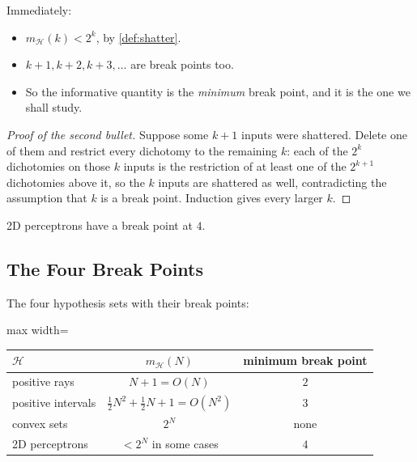Immediately:

\begin{itemize}
    \item \(m_{\mathcal{H}}(k) < 2^k\), by \autoref{def:shatter}.
    \item \(k + 1, k + 2, k + 3, \dots\) are break points too.
    \item So the informative quantity is the \emph{minimum} break point, and it
        is the one we shall study.
\end{itemize}

\begin{proof}[Proof of the second bullet]
    Suppose some \(k + 1\) inputs were shattered. Delete one of them and restrict
    every dichotomy to the remaining \(k\): each of the \(2^k\) dichotomies on
    those \(k\) inputs is the restriction of at least one of the \(2^{k+1}\)
    dichotomies above it, so the \(k\) inputs are shattered as well,
    contradicting the assumption that \(k\) is a break point. Induction gives
    every larger \(k\).
\end{proof}

\begin{moral}
    2D perceptrons have a break point at \(4\).
\end{moral}

\subsection{The Four Break Points}

The four hypothesis sets with their break points:

\begin{center}
    \solidrules
    \begin{adjustbox}{max width=\textwidth}
        \begin{tabular}{@{}l|c|c@{}}
            \toprule
            \(\mathcal{H}\) & \(m_{\mathcal{H}}(N)\) & minimum break point\\
            \midrule
            positive rays & \(N + 1 = O(N)\) & \(2\)\\
            positive intervals
            & \(\tfrac{1}{2} N^2 + \tfrac{1}{2} N + 1 = O(N^2)\) & \(3\)\\
            convex sets & \(2^N\) & none\\
            2D perceptrons & \(< 2^N\) in some cases & \(4\)\\
            \bottomrule
        \end{tabular}
    \end{adjustbox}
\end{center}

